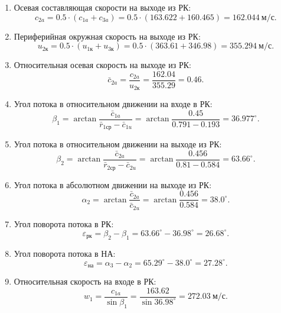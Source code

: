 \documentclass[a4paper,10pt]{article}
\begin{document}
\begin{enumerate}
        \item Осевая составляющая скорости на выходе из РК:
        \[
            c_{2a} = 0.5 \cdot (c_{1a} + c_{3a} ) = 
            0.5 \cdot (163.622 + 160.465) = 
            162.044\ м/с.
        \]

        \item Периферийная окружная скорость на выходе из РК:
        \[
            u_{2к} = 0.5 \cdot (u_{1к} + u_{3к}) = 
            0.5 \cdot ( 363.61 + 346.98 ) = 
            355.294\ м/с.
        \]

        \item Относительная осевая скорость на выходе из РК:
        \[
            \bar{c}_{2a} = \frac{ c_{2a} }{ u_{2к} } = 
            \frac{ 162.04 }{ 355.29 } = 
            0.46.
        \]

        \item Угол потока в относительном движении на входе в РК:
        \[
            \beta_1 = \arctan{ \frac{ \bar{c}_{1a} }{ \bar{r}_{1ср} - \bar{c}_{1u} } } = 
            \arctan{ \frac{ 0.45 }{ 0.791 - 0.193 } } =
            36.977^\circ.
        \] 

        \item Угол потока в относительном движении на выходе из РК:
        \[
            \beta_2 = \arctan{ \frac{ \bar{c}_{2a} }{ \bar{r}_{2ср} - \bar{c}_{2u} } } = 
            \arctan{ \frac{ 0.456 }{ 0.81 - 0.584 } } =
            63.66^\circ.
        \] 

        \item Угол потока в абсолютном движении на выходе из РК:
        \[
            \alpha_2 = \arctan{ \frac{ \bar{c}_{2a} }{ \bar{c}_{2u} } } = 
            \arctan{ \frac{ 0.456 }{ 0.584 } } =
            38.0^\circ.
        \]

        \item Угол поворота потока в РК:
        \[
            \varepsilon_{рк} = \beta_2 - \beta_1 = 
            63.66^\circ - 36.98^\circ = 
            26.68^\circ.
        \]

         \item Угол поворота потока в НА:
        \[
            \varepsilon_{на} = \alpha_3 - \alpha_2 = 
            65.29^\circ - 38.0^\circ = 
            27.28^\circ.
        \]

        \item Относительная скорость на входе в РК:
        \[
            w_1 = \frac{ c_{1a} }{ \sin{\beta_1} } = 
            \frac{ 163.62 }{ \sin{ 36.98^\circ } } = 
            272.03\ м/с.
        \]


\end{enumerate}
\end{document}
